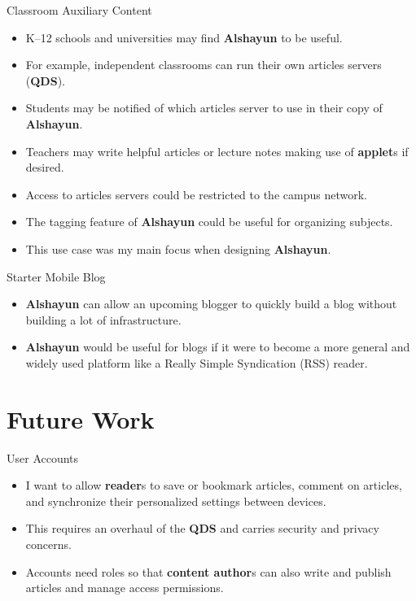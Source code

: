 \documentclass{beamer}
\begin{document}
\begin{frame}{Classroom Auxiliary Content}
    \begin{itemize}
        \item K--12 schools and universities may find \textbf{Alshayun} to be
            useful.
        \item For example, independent classrooms can run their own articles
            servers (\textbf{QDS}).
        \item Students may be notified of which articles server to use in their
            copy of \textbf{Alshayun}.
        \item Teachers may write helpful articles or lecture notes making use of
            \textbf{applet}s if desired.
        \item Access to articles servers could be restricted to the campus
            network.
        \item The tagging feature of \textbf{Alshayun} could be useful for
            organizing subjects.
        \item This use case was my main focus when designing \textbf{Alshayun}.
    \end{itemize}
\end{frame}

\begin{frame}{Starter Mobile Blog}
    \begin{itemize}
        \item \textbf{Alshayun} can allow an upcoming blogger to quickly build a
            blog without building a lot of infrastructure.
        \item \textbf{Alshayun} would be useful for blogs if it were to become a
            more general and widely used platform like a Really Simple
            Syndication (RSS) reader.
    \end{itemize}
\end{frame}

\section{Future Work}

\begin{frame}{User Accounts}
    \begin{itemize}
        \item I want to allow \textbf{reader}s to save or bookmark articles,
            comment on articles, and synchronize their personalized settings
            between devices.
        \item This requires an overhaul of the \textbf{QDS} and carries security
            and privacy concerns.
        \item Accounts need roles so that \textbf{content author}s can also
            write and publish articles and manage access permissions.
    \end{itemize}
\end{frame}
\end{document}
